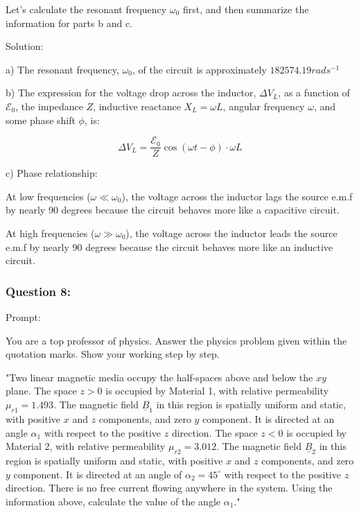 \documentclass[a4paper,11pt]{article}
\begin{document}
Let's calculate the resonant frequency \( \omega_{0} \) first, and then summarize the information for parts b and c.

Solution:

a) The resonant frequency, \( \omega_0 \), of the circuit is approximately \( 182574.19 rads^{-1} \)

b) The expression for the voltage drop across the inductor, \( \Delta V_L \), as a function of \( \mathcal{E}_0 \), the impedance \(Z\), inductive reactance \(X_L = \omega L\), angular frequency \( \omega \), and some phase shift \( \phi \), is:

\[ \Delta V_L = \frac{\mathcal{E}_0}{Z} \cos(\omega t - \phi) \cdot \omega L \]

c) Phase relationship:

At low frequencies (\( \omega \ll \omega_0 \)), the voltage across the inductor lags the source e.m.f by nearly 90 degrees because the circuit behaves more like a capacitive circuit.

At high frequencies (\( \omega \gg \omega_0 \)), the voltage across the inductor leads the source e.m.f by nearly 90 degrees because the circuit behaves more like an inductive circuit.

\subsubsection*{Question 8:}

Prompt:
\begin{spverbatim}
    You are a top professor of physics. Answer the physics problem given within the quotation marks. Show your working step by step.

    "Two linear magnetic media occupy the half-spaces above and below the \( xy \) plane. The space \( z > 0 \) is occupied by Material 1, with relative permeability \( \mu_{r1} = 1.493 \). The magnetic field \( \underline{B}_{1} \) in this region is spatially uniform and static, with positive \( x \) and \( z \) components, and zero \( y \) component. It is directed at an angle \( \alpha_{1} \) with respect to the positive \( z \) direction. The space \( z < 0 \) is occupied by Material 2, with relative permeability \( \mu_{r2}= 3.012 \). The magnetic field \( \underline{B}_{2} \) in this region is spatially uniform and static, with positive \( x \) and \( z \) components, and zero \( y \) component. It is directed at an angle of \( \alpha_{2} = 45^\circ \) with respect to the positive \( z \) direction. There is no free current flowing anywhere in the system. Using the information above, calculate the value of the angle \( \alpha_{1} \)."
\end{spverbatim}
\end{document}
